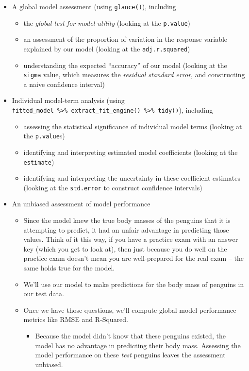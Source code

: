 \documentclass[
  letterpaper,
  DIV=11,
  numbers=noendperiod]{scrartcl}
\providecommand{\tightlist}{%
  \setlength{\itemsep}{0pt}\setlength{\parskip}{0pt}}\usepackage{longtable,booktabs,array}
\begin{document}
\begin{itemize}
\item
  A global model assessment (using \texttt{glance()}), including

  \begin{itemize}
  \tightlist
  \item
    the \emph{global test for model utility} (looking at the
    \texttt{p.value})
  \item
    an assessment of the proportion of variation in the response
    variable explained by our model (looking at the
    \texttt{adj.r.squared})
  \item
    understanding the expected ``accuracy'' of our model (looking at the
    \texttt{sigma} value, which measures the \emph{residual standard
    error}, and constructing a naive confidence interval)
  \end{itemize}
\item
  Individual model-term analysis (using
  \texttt{fitted\_model\ \%\textgreater{}\%\ extract\_fit\_engine()\ \%\textgreater{}\%\ tidy()}),
  including

  \begin{itemize}
  \tightlist
  \item
    assessing the statistical significance of individual model terms
    (looking at the \texttt{p.value}s)
  \item
    identifying and interpreting estimated model coefficients (looking
    at the \texttt{estimate})
  \item
    identifying and interpreting the uncertainty in these coefficient
    estimates (looking at the \texttt{std.error} to construct confidence
    intervals)
  \end{itemize}
\item
  An unbiased assessment of model performance

  \begin{itemize}
  \item
    Since the model knew the true body masses of the penguins that it is
    attempting to predict, it had an unfair advantage in predicting
    those values. Think of it this way, if you have a practice exam with
    an answer key (which you get to look at), then just because you do
    well on the practice exam doesn't mean you are well-prepared for the
    real exam -- the same holds true for the model.
  \item
    We'll use our model to make predictions for the body mass of
    penguins in our test data.
  \item
    Once we have those questions, we'll compute global model performance
    metrics like RMSE and R-Squared.

    \begin{itemize}
    \tightlist
    \item
      Because the model didn't know that these penguins existed, the
      model has no advantage in predicting their body mass. Assessing
      the model performance on these \emph{test} penguins leaves the
      assessment unbiased.
    \end{itemize}
  \end{itemize}
\end{itemize}
\end{document}
